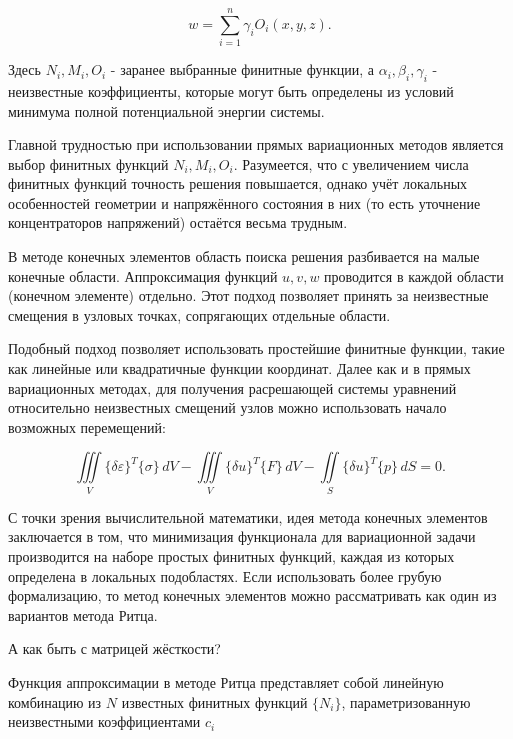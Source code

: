 \documentclass{article}
\begin{document}
\begin{displaymath}
	w = \sum_{i=1}^n  \gamma_{i} O_{i}(x, y, z).
\end{displaymath}

\noindent Здесь $N_{i}, M_{i}, O_{i}$ - заранее выбранные финитные функции, а $\alpha_{i}, \beta_{i}, \gamma_{i}$ - неизвестные коэффициенты, которые могут быть определены из условий минимума полной потенциальной энергии системы.

Главной трудностью при использовании прямых вариационных методов является выбор финитных функций $N_{i}, M_{i}, O_{i}$. 
Разумеется, что с увеличением числа финитных функций точность решения повышается, однако учёт локальных особенностей геометрии и напряжённого состояния в них (то есть уточнение концентраторов напряжений) остаётся весьма трудным.

В методе конечных элементов область поиска решения разбивается на малые конечные области. Аппроксимация функций $u, v, w$ проводится в каждой области (конечном элементе) отдельно. Этот подход позволяет принять за неизвестные смещения в узловых точках, сопрягающих отдельные области.

Подобный подход позволяет использовать простейшие финитные функции, такие как линейные или квадратичные функции координат. Далее как и в прямых вариационных методах, для получения расрешающей системы уравнений относительно неизвестных смещений узлов можно использовать начало возможных перемещений:

\begin{displaymath}
	\iiint\limits_V \{ \delta \varepsilon \}^{T} \{\sigma\} \,dV - \iiint\limits_V \{ \delta u \}^{T} \{ F \} \,dV - \iint\limits_S \{ \delta u \}^{T} \{ p \} \,dS = 0.
\end{displaymath}

С точки зрения вычислительной математики, идея метода конечных элементов заключается в том, что минимизация функционала для вариационной задачи производится на наборе простых финитных функций, каждая из которых определена в локальных подобластях. Если использовать более грубую формализацию, то метод конечных элементов можно рассматривать как один из вариантов метода Ритца.

\newpage
\begin{question}
	А как быть с матрицей жёсткости?
\end{question}

Функция аппроксимации в методе Ритца представляет собой линейную комбинацию из $N$ известных финитных функций $\{ N_{i} \}$, параметризованную неизвестными коэффициентами $c_{i}$
\end{document}
